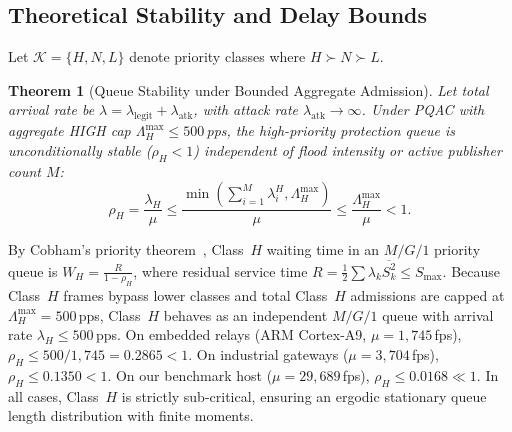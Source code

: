 \documentclass[journal]{IEEEtran}
\newtheorem{theorem}{Theorem}
\newenvironment{proof}{\begin{IEEEproof}}{\end{IEEEproof}}
\begin{document}
\subsection{Theoretical Stability and Delay Bounds}
Let $\mathcal{K} = \{H, N, L\}$ denote priority classes where $H \succ N \succ L$.

\begin{theorem}[Queue Stability under Bounded Aggregate Admission]
\label{thm:stability}
Let total arrival rate be $\lambda = \lambda_{\text{legit}} + \lambda_{\text{atk}}$, with attack rate $\lambda_{\text{atk}} \to \infty$. Under PQAC with aggregate HIGH cap $\Lambda_H^{\max} \le 500$\,pps, the high-priority protection queue is unconditionally stable ($\rho_H < 1$) independent of flood intensity or active publisher count $M$:
\begin{equation}
\rho_H = \frac{\lambda_H}{\mu} \le \frac{\min\left(\sum_{i=1}^M \lambda_i^H, \Lambda_H^{\max}\right)}{\mu} \le \frac{\Lambda_H^{\max}}{\mu} < 1.
\end{equation}
\end{theorem}
\begin{proof}
By Cobham's priority theorem~\cite{cobham1954priority}, Class~$H$ waiting time in an $M/G/1$ priority queue is $W_H = \frac{R}{1 - \rho_H}$, where residual service time $R = \frac{1}{2} \sum \lambda_k \overline{S_k^2} \le S_{\max}$. Because Class~$H$ frames bypass lower classes and total Class~$H$ admissions are capped at $\Lambda_H^{\max} = 500$\,pps, Class~$H$ behaves as an independent $M/G/1$ queue with arrival rate $\lambda_H \le 500$\,pps. On embedded relays (ARM Cortex-A9, $\mu = 1{,}745$\,fps), $\rho_H \le 500/1{,}745 = 0.2865 < 1$. On industrial gateways ($\mu = 3{,}704$\,fps), $\rho_H \le 0.1350 < 1$. On our benchmark host ($\mu = 29{,}689$\,fps), $\rho_H \le 0.0168 \ll 1$. In all cases, Class~$H$ is strictly sub-critical, ensuring an ergodic stationary queue length distribution with finite moments.
\end{proof}
\end{document}

